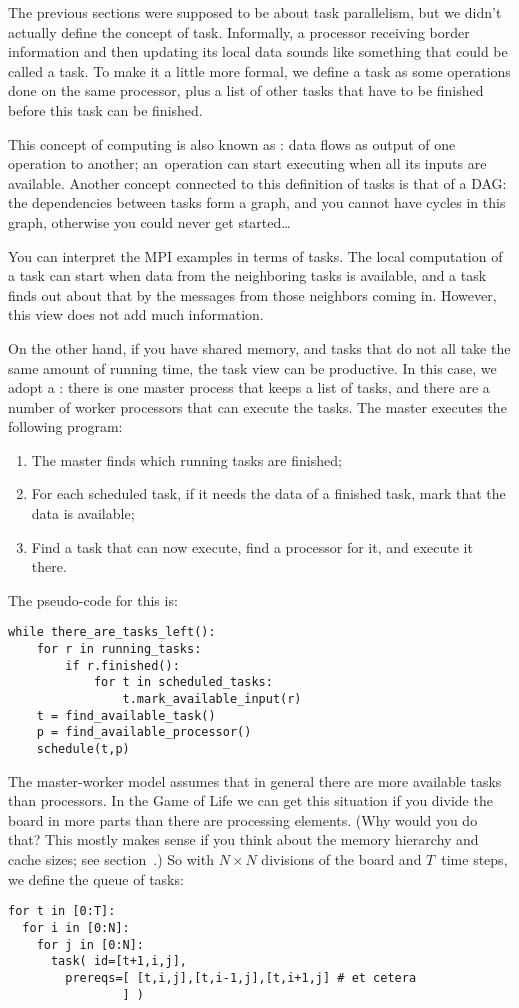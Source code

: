 The previous sections were supposed to be about task parallelism, but
we didn't actually define the concept of task. Informally, a processor
receiving border information and then updating its local data sounds
like something that could be called a task.  To make it a little
more formal, we define a task as some operations done on the same
processor, plus a list of other tasks that have to be finished before
this task can be finished.

This concept of computing is also known as : data
flows as output of one operation to another; an~operation can start
executing when all its inputs are available. Another concept connected
to this definition of tasks is that of a \acf{DAG}: the dependencies
between tasks form a graph, and you cannot have cycles in this graph,
otherwise you could never get started\ldots

You can interpret the MPI examples in terms of tasks.
The local computation of a task can start when data from the
neighboring tasks is available, and a task finds out about that
by the messages from those neighbors coming in. However, 
this view does not add much information.

On the other hand, if you have shared memory, and tasks that do not
all take the same amount of running time, the task view can be
productive. In this case, we adopt a :
there is one master process that keeps a list of tasks, and there are
a number of worker processors that can execute the tasks. The master executes
the following program:
\begin{enumerate}
\item The master finds which running tasks are finished;
\item For each scheduled task, if it needs the data of a finished
  task, mark that the data is available;
\item Find a task that can now execute, find a processor for it, and
  execute it there.
\end{enumerate}
The pseudo-code for this is:
\begin{verbatim}
while there_are_tasks_left():
    for r in running_tasks:
        if r.finished():
            for t in scheduled_tasks:
                t.mark_available_input(r)
    t = find_available_task()
    p = find_available_processor()
    schedule(t,p)
\end{verbatim}

The master-worker model assumes that in general there are more
available tasks than processors. In the Game of Life we can get
this situation if you divide the board in more parts than there
are processing elements. (Why would you do that? This mostly makes
sense if you think about the memory hierarchy and cache sizes; see
section~.) So with
$N\times N$ divisions of the board and $T$~time steps, we define the queue
of tasks:
\begin{verbatim}
for t in [0:T]:
  for i in [0:N]:
    for j in [0:N]:
      task( id=[t+1,i,j], 
        prereqs=[ [t,i,j],[t,i-1,j],[t,i+1,j] # et cetera
                ] )
\end{verbatim}

